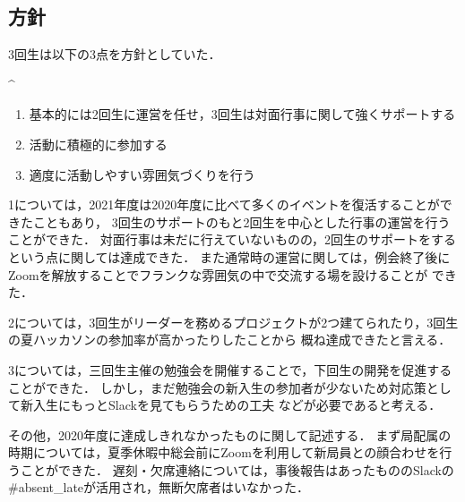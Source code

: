 \subsection*{\newGradeIfKouki{}\thirdGrade{}方針}


3回生は以下の3点を方針としていた．

^\begin{enumerate}
    \item 基本的には2回生に運営を任せ，3回生は対面行事に関して強くサポートする
    \item 活動に積極的に参加する
    \item 適度に活動しやすい雰囲気づくりを行う
\end{enumerate}


1については，2021年度は2020年度に比べて多くのイベントを復活することができたこともあり，
3回生のサポートのもと2回生を中心とした行事の運営を行うことができた．
対面行事は未だに行えていないものの，2回生のサポートをするという点に関しては達成できた．
また通常時の運営に関しては，例会終了後にZoomを解放することでフランクな雰囲気の中で交流する場を設けることが
できた．

2については，3回生がリーダーを務めるプロジェクトが2つ建てられたり，3回生の夏ハッカソンの参加率が高かったりしたことから
概ね達成できたと言える．

3については，三回生主催の勉強会を開催することで，下回生の開発を促進することができた．
しかし，まだ勉強会の新入生の参加者が少ないため対応策として新入生にもっとSlackを見てもらうための工夫
などが必要であると考える．

その他，2020年度に達成しきれなかったものに関して記述する．
まず局配属の時期については，夏季休暇中総会前にZoomを利用して新局員との顔合わせを行うことができた．
遅刻・欠席連絡については，事後報告はあったもののSlackの#absent_lateが活用され，無断欠席者はいなかった．

